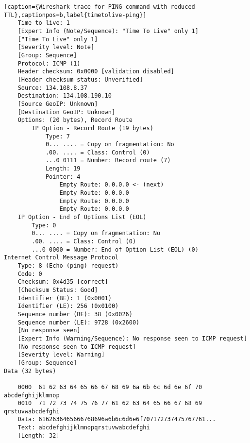 \begin{lstlisting}[caption={Wireshark trace for PING command with reduced TTL},captionpos=b,label{timetolive-ping}]
	Time to live: 1
	[Expert Info (Note/Sequence): "Time To Live" only 1]
	["Time To Live" only 1]
	[Severity level: Note]
	[Group: Sequence]
	Protocol: ICMP (1)
	Header checksum: 0x0000 [validation disabled]
	[Header checksum status: Unverified]
	Source: 134.108.8.37
	Destination: 134.108.190.10
	[Source GeoIP: Unknown]
	[Destination GeoIP: Unknown]
	Options: (20 bytes), Record Route
		IP Option - Record Route (19 bytes)
			Type: 7
			0... .... = Copy on fragmentation: No
			.00. .... = Class: Control (0)
			...0 0111 = Number: Record route (7)
			Length: 19
			Pointer: 4
				Empty Route: 0.0.0.0 <- (next)
				Empty Route: 0.0.0.0
				Empty Route: 0.0.0.0
				Empty Route: 0.0.0.0
	IP Option - End of Options List (EOL)
		Type: 0
		0... .... = Copy on fragmentation: No
		.00. .... = Class: Control (0)
		...0 0000 = Number: End of Option List (EOL) (0)
Internet Control Message Protocol
	Type: 8 (Echo (ping) request)
	Code: 0
	Checksum: 0x4d35 [correct]
	[Checksum Status: Good]
	Identifier (BE): 1 (0x0001)
	Identifier (LE): 256 (0x0100)
	Sequence number (BE): 38 (0x0026)
	Sequence number (LE): 9728 (0x2600)
	[No response seen]
	[Expert Info (Warning/Sequence): No response seen to ICMP request]
	[No response seen to ICMP request]
	[Severity level: Warning]
	[Group: Sequence]
Data (32 bytes)

	0000  61 62 63 64 65 66 67 68 69 6a 6b 6c 6d 6e 6f 70   abcdefghijklmnop
	0010  71 72 73 74 75 76 77 61 62 63 64 65 66 67 68 69   qrstuvwabcdefghi
	Data: 6162636465666768696a6b6c6d6e6f707172737475767761...
	Text: abcdefghijklmnopqrstuvwabcdefghi
	[Length: 32]
\end{lstlisting}
